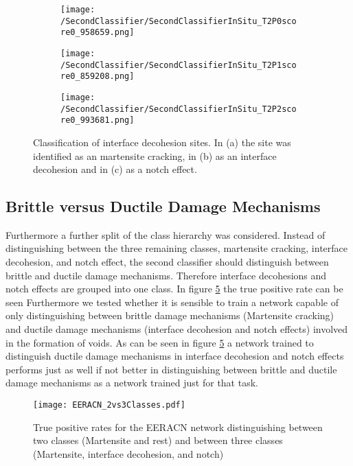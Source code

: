 \begin{figure}[H]
\centering
\begin{subfigure}{0.3\textwidth}
\texttt{[image: /SecondClassifier/SecondClassifierInSitu\_T2P0score0\_958659.png]}
\caption{}
\label{sub:InSituNotchEffectSamplesM}
\end{subfigure}
\begin{subfigure}{0.3\textwidth}
\texttt{[image: /SecondClassifier/SecondClassifierInSitu\_T2P1score0\_859208.png]}
\caption{}
\label{sub:InSituNotchEffectSamplesI}
\end{subfigure}
\begin{subfigure}{0.3\textwidth}
\texttt{[image: /SecondClassifier/SecondClassifierInSitu\_T2P2score0\_993681.png]}
\caption{}
\label{sub:InSituNotchEffectSamplesN}
\end{subfigure}
\caption{Classification of interface decohesion sites. In (a) the site was identified as an martensite cracking, in (b) as an interface decohesion and in (c) as a notch effect. }
\label{fig:InSituNotchEffectSamples}
\end{figure}

\subsection{Brittle versus Ductile Damage Mechanisms}
Furthermore a further split of the class hierarchy was considered. Instead of distinguishing between the three remaining classes, martensite cracking, interface decohesion, and notch effect, the second classifier should distinguish between brittle and ductile damage mechanisms. Therefore interface decohesions and notch effects are grouped into one class. In figure \ref{fig:2vs3Classes} the true positive rate can be seen 
Furthermore we tested whether it is sensible to train a network capable of only distinguishing between brittle damage mechanisms (Martensite cracking) and ductile damage mechanisms (interface decohesion and notch effects) involved in the formation of voids. As can be seen in figure \ref{fig:2vs3Classes} a network trained to distinguish ductile damage mechanisms in interface decohesion and notch effects performs just as well if not better in distinguishing between brittle and ductile damage mechanisms as a network trained just for that task.

\begin{figure}
  \texttt{[image: EERACN\_2vs3Classes.pdf]}
\caption{True positive rates for the EERACN network distinguishing between two classes (Martensite and rest) and between three classes (Martensite, interface decohesion, and notch)}
\label{fig:2vs3Classes}
\end{figure}

